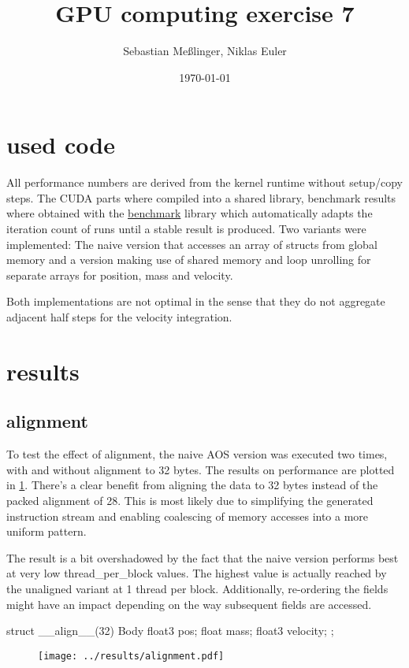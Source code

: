 \documentclass[11pt,twoside,a4paper]{scrartcl}
\title{GPU computing exercise 7}
\date{\today}
\author{Sebastian Meßlinger, Niklas Euler}
\begin{document}
\maketitle

\section{used code}

All performance numbers are derived from the kernel runtime without setup/copy steps.
The CUDA parts where compiled into a shared library, benchmark results where obtained with the \href{https://github.com/google/benchmark}{benchmark} library which automatically adapts the iteration count of runs until a stable result is produced.
Two variants were implemented: The naive version that accesses an array of structs from global memory and a version making use of shared memory and loop unrolling for separate arrays for position, mass and velocity.

Both implementations are not optimal in the sense that they do not aggregate adjacent half steps for the velocity integration.

\section{results}
\subsection{alignment}

To test the effect of alignment, the naive AOS version was executed two times, with and without alignment to 32 bytes. The results on performance are plotted in \ref{align}. There's a clear benefit from aligning the data to 32 bytes instead of the packed alignment of 28. This is  most likely due to simplifying the generated instruction stream and enabling coalescing of memory accesses into a more uniform pattern. 

The result is a bit overshadowed by the fact that the naive version performs best at very low thread\_per\_block values. The highest value is actually reached by the unaligned variant at 1 thread per block.
Additionally, re-ordering the fields might have an impact depending on the way subsequent fields are accessed.

\begin{pygmented}[lang=cpp]
    struct __align__(32) Body{
        float3 pos;
        float mass;
        float3 velocity;
    };    
\end{pygmented}
\begin{figure}[h!]
    \texttt{[image: ../results/alignment.pdf]}
    \caption{}
    \label{align}
\end{figure}
\end{document}
